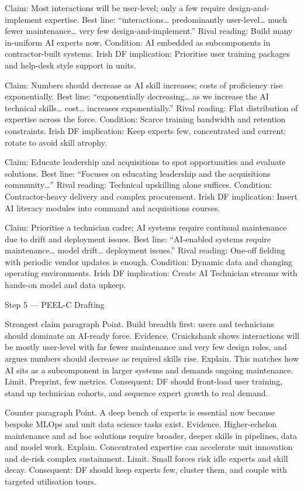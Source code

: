 Claim: Most interactions will be user-level; only a few require design-and-implement expertise.
Best line: “interactions… predominantly user-level… much fewer maintenance… very few design-and-implement.”
Rival reading: Build many in-uniform AI experts now.
Condition: AI embedded as subcomponents in contractor-built systems.
Irish DF implication: Prioritise user training packages and help-desk style support in units.

Claim: Numbers should decrease as AI skill increases; costs of proficiency rise exponentially.
Best line: “exponentially decreasing… as we increase the AI technical skills… cost… increases exponentially.”
Rival reading: Flat distribution of expertise across the force.
Condition: Scarce training bandwidth and retention constraints.
Irish DF implication: Keep experts few, concentrated and current; rotate to avoid skill atrophy.

Claim: Educate leadership and acquisitions to spot opportunities and evaluate solutions.
Best line: “Focuses on educating leadership and the acquisitions community…”
Rival reading: Technical upskilling alone suffices.
Condition: Contractor-heavy delivery and complex procurement.
Irish DF implication: Insert AI literacy modules into command and acquisitions courses.

Claim: Prioritise a technician cadre; AI systems require continual maintenance due to drift and deployment issues.
Best line: “AI-enabled systems require maintenance… model drift… deployment issues.”
Rival reading: One-off fielding with periodic vendor updates is enough.
Condition: Dynamic data and changing operating environments.
Irish DF implication: Create AI Technician streams with hands-on model and data upkeep.

Step 5 — PEEL-C Drafting

Strongest claim paragraph
Point. Build breadth first: users and technicians should dominate an AI-ready force.
Evidence. Cruickshank shows interactions will be mostly user-level with far fewer maintenance and very few design roles, and argues numbers should decrease as required skills rise.
Explain. This matches how AI sits as a subcomponent in larger systems and demands ongoing maintenance.
Limit. Preprint, few metrics. Consequent: DF should front-load user training, stand up technician cohorts, and sequence expert growth to real demand.

Counter paragraph
Point. A deep bench of experts is essential now because bespoke MLOps and unit data science tasks exist.
Evidence. Higher-echelon maintenance and ad hoc solutions require broader, deeper skills in pipelines, data and model work.
Explain. Concentrated expertise can accelerate unit innovation and de-risk complex sustainment.
Limit. Small forces risk idle experts and skill decay. Consequent: DF should keep experts few, cluster them, and couple with targeted utilisation tours.


